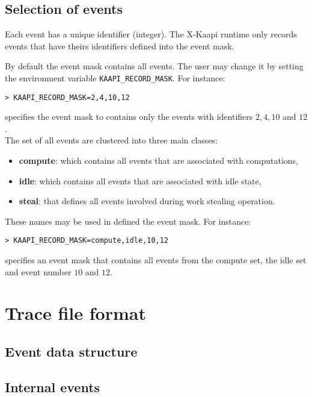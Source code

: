 \documentclass{article}[12pt]
\newcommand{\kaapi}{\textsc{X}-Kaapi\xspace}
\begin{document}
\subsection{Selection of events}

Each event has a unique identifier (integer). The \kaapi runtime only records events that have theirs identifiers defined into the event mask. 

By default the event mask  contains all events. The user may change it  by setting the environment variable \verb+KAAPI_RECORD_MASK+. For instance:
\begin{verbatim}
> KAAPI_RECORD_MASK=2,4,10,12
\end{verbatim}
specifies the event mask to contains only the events with identifiers  $2,4,10$ and $12$.\\

The set of all events are clustered into three main classes:
\begin{itemize}
\item \textbf{compute}: which contains all  events that are associated with computations,
\item \textbf{idle}: which contains all events that are associated with idle state,
\item \textbf{steal}: that defines all events involved during work stealing operation.
\end{itemize}
These names may be used in defined the event mask. For instance:
\begin{verbatim}
> KAAPI_RECORD_MASK=compute,idle,10,12
\end{verbatim}
specifies an event mask that contains all events from the compute set, the idle set and event number $10$ and $12$.

\section{Trace file format} \label{sec:selection}

\subsection{Event data structure}

\subsection{Internal events}
\end{document}
